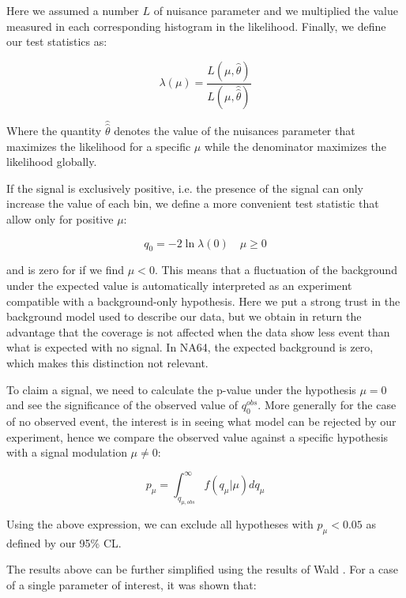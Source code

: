Here we assumed a number $L$ of nuisance parameter and we multiplied the value measured in each corresponding histogram in the likelihood. Finally, we define our test statistics as:

\begin{equation}
  \label{eq:profile-likelihood}
  \lambda(\mu) = \frac{L(\mu,\hat{\theta})}{L(\mu,\hat{\hat{\theta}})}
\end{equation}

Where the quantity $\hat{\hat{\theta}}$ denotes the value of the nuisances parameter that maximizes the likelihood for a specific $\mu$ while the denominator maximizes the likelihood globally.

If the signal is exclusively positive, i.e. the presence of the signal can only increase the value of each bin, we define a more convenient test statistic that allow only for positive $\mu$:

\begin{equation}
  \label{eq:profile-q}
  q_0 = -2\ln{\lambda(0)} \quad \mu \geq 0
\end{equation}

and is zero for if we find $\mu < 0$. This means that a fluctuation of the background under the expected value is automatically interpreted as an experiment compatible with a background-only hypothesis. Here we put a strong trust in the background model used to describe our data, but we obtain in return the advantage that the coverage is not affected when the data show less event than what is expected with no signal. In NA64, the expected background is zero, which makes this distinction not relevant.

To claim a signal, we need to calculate the p-value under the hypothesis $\mu = 0$ and see the significance of the observed value of $q^{obs}_0$. More generally for the case of no observed event, the interest is in seeing what model can be rejected by our experiment, hence we compare the observed value against a specific hypothesis with a signal modulation $\mu \neq 0$:

\begin{equation}
  \label{eq:p-value-q}
  p_{\mu} = \int_{q_{\mu, obs}}^{\infty} f(q_{\mu}|\mu) dq_{\mu}
\end{equation}

Using the above expression, we can exclude all hypotheses with $p_{\mu} < 0.05$ as defined by our 95\% CL.

The results above can be further simplified using the results of Wald \cite{10.2307/1990256}. For a case of a single parameter of interest, it was shown that:

